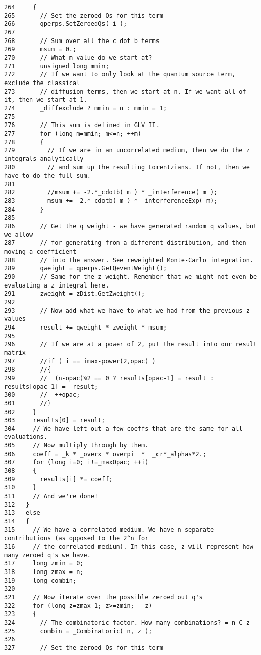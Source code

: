 \begin{Code}
\begin{verbatim}
264     {
265       // Set the zeroed Qs for this term
266       qperps.SetZeroedQs( i );
267     
268       // Sum over all the c dot b terms
269       msum = 0.;
270       // What m value do we start at?
271       unsigned long mmin;
272       // If we want to only look at the quantum source term, exclude the classical
273       // diffusion terms, then we start at n. If we want all of it, then we start at 1.
274       _diffexclude ? mmin = n : mmin = 1;
275 
276       // This sum is defined in GLV II.
277       for (long m=mmin; m<=n; ++m)
278       {
279         // If we are in an uncorrelated medium, then we do the z integrals analytically
280         // and sum up the resulting Lorentzians. If not, then we have to do the full sum.
281 
282         //msum += -2.*_cdotb( m ) * _interference( m );
283         msum += -2.*_cdotb( m ) * _interferenceExp( m);
284       }
285 
286       // Get the q weight - we have generated random q values, but we allow
287       // for generating from a different distribution, and then moving a coefficient
288       // into the answer. See reweighted Monte-Carlo integration.
289       qweight = qperps.GetQeventWeight();
290       // Same for the z weight. Remember that we might not even be evaluating a z integral here.
291       zweight = zDist.GetZweight();
292 
293       // Now add what we have to what we had from the previous z values
294       result += qweight * zweight * msum;
295 
296       // If we are at a power of 2, put the result into our result matrix
297       //if ( i == imax-power(2,opac) )
298       //{
299       //  (n-opac)%2 == 0 ? results[opac-1] = result : results[opac-1] = -result;
300       //  ++opac;
301       //}
302     }
303     results[0] = result;
304     // We have left out a few coeffs that are the same for all evaluations.
305     // Now multiply through by them.
306     coeff = _k * _overx * overpi  *  _cr*_alphas*2.;
307     for (long i=0; i!=_maxOpac; ++i)
308     {
309       results[i] *= coeff;
310     }
311     // And we're done!
312   }
313   else
314   {
315     // We have a correlated medium. We have n separate contributions (as opposed to the 2^n for
316     // the correlated medium). In this case, z will represent how many zeroed q's we have.
317     long zmin = 0;
318     long zmax = n;
319     long combin;
320 
321     // Now iterate over the possible zeroed out q's
322     for (long z=zmax-1; z>=zmin; --z)
323     {
324       // The combinatoric factor. How many combinations? = n C z
325       combin = _Combinatoric( n, z );
326       
327       // Set the zeroed Qs for this term

\end{verbatim}
\end{Code}

